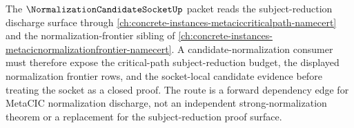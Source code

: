 The $\NormalizationCandidateSocketUp$ packet reads the subject-reduction discharge surface through \autoref{ch:concrete-instances-metaciccriticalpath-namecert} and the normalization-frontier sibling of \autoref{ch:concrete-instances-metacicnormalizationfrontier-namecert}. A candidate-normalization consumer must therefore expose the critical-path subject-reduction budget, the displayed normalization frontier rows, and the socket-local candidate evidence before treating the socket as a closed proof. The route is a forward dependency edge for MetaCIC normalization discharge, not an independent strong-normalization theorem or a replacement for the subject-reduction proof surface.
